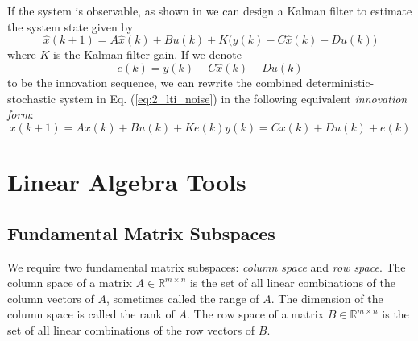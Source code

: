 If the system is observable, as shown in \cite{kalman1960new} we can design a Kalman filter to estimate the system state given by
\begin{equation*}
\hat{x}(k+1) = A\hat{x}(k) + Bu(k) + K\big(y(k) - C\hat{x}(k) - Du(k)\big)
\end{equation*}
where $K$ is the Kalman filter gain. If we denote 
\begin{equation*}
e(k) = y(k) - C\hat{x}(k) - Du(k)
\end{equation*}
to be the innovation sequence, we can rewrite the combined deterministic-stochastic system in Eq. (\ref{eq:2_lti_noise}) in the following equivalent \textit{innovation form}:
\begin{subequations}\label{eq:2_innovation}
\begin{equation}x(k+1) = Ax(k) + Bu(k) + Ke(k)\end{equation}
\begin{equation}y(k) = Cx(k) + Du(k) + e(k)\end{equation}
\end{subequations}

\section{Linear Algebra Tools}

\subsection{Fundamental Matrix Subspaces}
We require two fundamental matrix subspaces: \textit{column space} and \textit{row space}. The column space of a matrix $A \in \mathbb{R}^{m\times n}$ is the set of all linear combinations of the column vectors of $A$, sometimes called the range of $A$. The dimension of the column space is called the rank of $A$. The row space of a matrix $B \in \mathbb{R}^{m\times n}$ is the set of all linear combinations of the row vectors of $B$.


